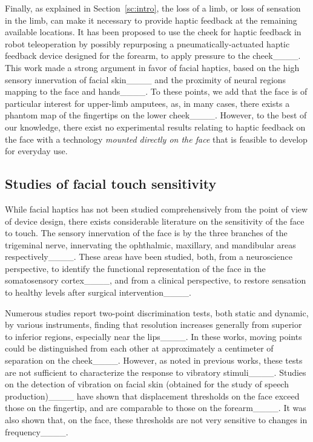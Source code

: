 Finally, as explained in Section~\ref{sc:intro}, the loss of a limb, or loss of sensation in the limb, can make it necessary to provide haptic feedback at the remaining available locations. It has been proposed to use the cheek for haptic feedback in robot teleoperation by possibly repurposing a pneumatically-actuated haptic feedback device designed for the forearm, to apply pressure to the cheek____. This work made a strong argument in favor of facial haptics, based on the high sensory innervation of facial skin____ and the proximity of neural regions mapping to the face and hands____. To these points, we add that the face is of particular interest for upper-limb amputees, as, in many cases, there exists a phantom map of the fingertips on the lower cheek____. However, to the best of our knowledge, there exist no experimental results relating to haptic feedback on the face with a technology \emph{mounted directly on the face} that is feasible to develop for everyday use. 

\subsection{Studies of facial touch sensitivity}
While facial haptics has not been studied comprehensively from the point of view of device design, there exists considerable literature on the sensitivity of the face to touch. The sensory innervation of the face is by the three branches of the trigeminal nerve, innervating the ophthalmic, maxillary, and mandibular areas respectively____. These areas have been studied, both, from a neuroscience perspective, to identify the functional representation of the face in the somatosensory cortex____, and from a clinical perspective, to restore sensation to healthy levels after surgical intervention____.

Numerous studies report two-point discrimination tests, both static and dynamic, by various instruments, finding that resolution increases generally from superior to inferior regions, especially near the lips____. In these works, moving points could be distinguished from each other at approximately a centimeter of separation on the cheek____. However, as noted in previous works, these tests are not sufficient to characterize the response to vibratory stimuli____. Studies on the detection of vibration on facial skin (obtained for the study of speech production)____ have shown that displacement thresholds on the face exceed those on the fingertip, and are comparable to those on the forearm____. It was also shown that, on the face, these thresholds are not very sensitive to changes in frequency____.


